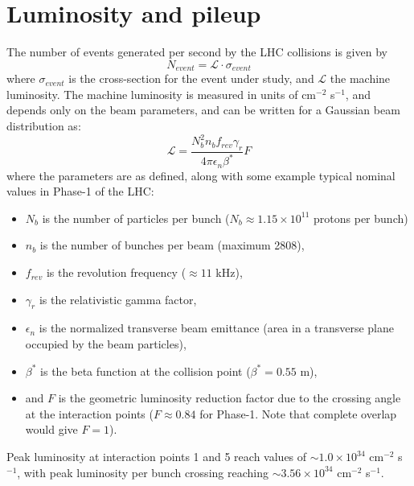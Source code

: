 \section{Luminosity and pileup}
The number of events generated per second by the LHC collisions is given by
\begin{equation}
     N_{event} = \mathcal{L} \cdot \sigma_{event}
    \label{eqn:nEvents}
\end{equation} 
where $\sigma_{event}$ is the cross-section for the event under study, and $\mathcal{L}$ the machine luminosity. The machine luminosity is measured in units of cm$^{-2}$ s$^{-1}$, and depends only on the beam parameters, and can be written for a Gaussian beam distribution as:
\begin{equation}
    \mathcal{L} = \frac{N_b^2 n_b f_{rev} \gamma_r}{4\pi \epsilon_n \beta^*} F
\end{equation}
where the parameters are as defined, along with some example typical nominal values in Phase-1 of the LHC:
\begin{itemize}
    \item $N_b$ is the number of particles per bunch ($N_b \approx 1.15 \times 10^{11}$ protons per bunch)
    \item $n_b$ is the number of bunches per beam (maximum 2808),
    \item $f_{rev}$ is the revolution frequency ($\approx 11$ kHz),
    \item $\gamma_r$ is the relativistic gamma factor,
    \item $\epsilon_n$ is the normalized transverse beam emittance (area in a transverse plane occupied by the beam particles),
    \item $\beta^*$ is the beta function at the collision point ($\beta^* = 0.55$ m),
    \item and $F$ is the geometric luminosity reduction factor due to the crossing angle at the interaction points ($F \approx 0.84$ for Phase-1. Note that complete overlap would give $F = 1$).
\end{itemize}
Peak luminosity at interaction points 1 and 5 reach values of $\sim 1.0 \times 10^{34}$ cm$^{-2}$ s$^{-1}$, with peak luminosity per bunch crossing reaching $\sim 3.56 \times 10^{34}$ cm$^{-2}$ s$^{-1}$.

